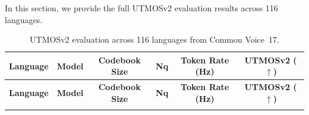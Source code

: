 \documentclass[preprint]{article}
\begin{document}
In this section, we provide the full UTMOSv2 evaluation results across 116 languages.

\begin{longtable}{llcccc}
\caption{UTMOSv2 evaluation across 116 languages from Common Voice~17.}
\label{tab:utmos-comparison-all} \\
\toprule
\textbf{Language} & \textbf{Model} & \textbf{Codebook Size} & \textbf{Nq} & \textbf{Token Rate (Hz)} & \textbf{UTMOSv2 ($\uparrow$)} \\
\midrule
\endfirsthead

\toprule
\textbf{Language} & \textbf{Model} & \textbf{Codebook Size} & \textbf{Nq} & \textbf{Token Rate (Hz)} & \textbf{UTMOSv2 ($\uparrow$)} \\
\midrule
\endhead

\midrule
\endfoot

\bottomrule
\endlastfoot


\end{longtable}
\end{document}
